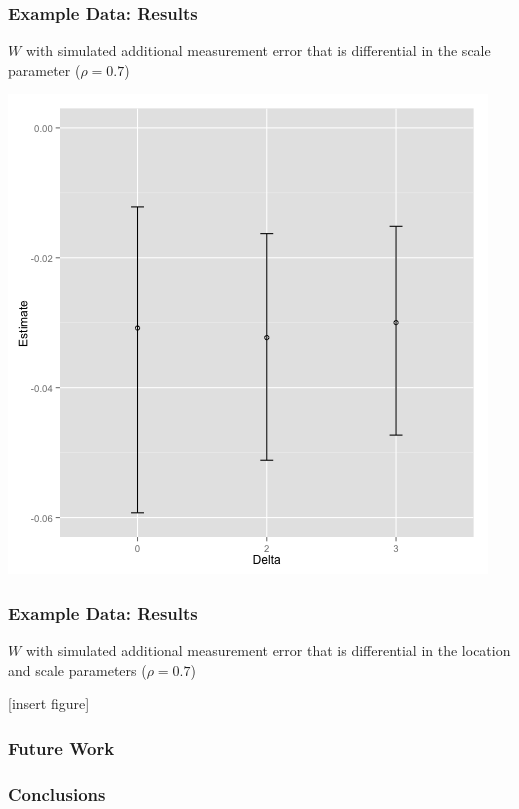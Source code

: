 \documentclass{beamer}
\begin{document}
\begin{frame}

\frametitle{ Example Data: Results}

$W$ with simulated additional measurement error that is differential in the scale parameter ($\rho=0.7$)

\centering
\includegraphics[width=\textwidth,height=0.7\textheight,keepaspectratio]{deltarealdatamini}

 

\end{frame} 

\begin{frame}

\frametitle{ Example Data: Results}

$W$ with simulated additional measurement error that is differential in the location and scale parameters ($\rho=0.7$)


[insert figure]

 

\end{frame} 

\begin{frame}

\frametitle{ Future Work}



\end{frame} 

\begin{frame}

\frametitle{ Conclusions}

\end{frame}
  
\end{document}
